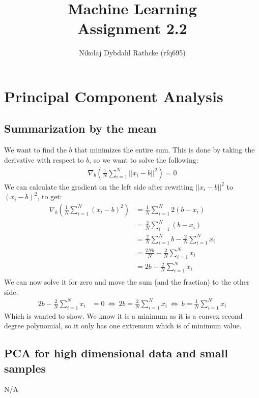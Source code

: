\documentclass[a4paper]{article}
\author{Nikolaj Dybdahl Rathcke (rfq695)}
\title{Machine Learning \\ Assignment 2.2}
\def\dpip{|\!|}
\begin{document}
\maketitle

\section{Principal Component Analysis}

\subsection{Summarization by the mean}
We want to find the $b$ that minimizes the entire sum. This is done by taking the derivative with respect to $b$, so we want to solve the following:
\begin{align*}
\nabla_b \left(\frac{1}{N}\sum_{i=1}^N \dpip x_i-b \dpip^2\right)=0
\end{align*}
We can calculate the gradient on the left side after rewriting $\dpip x_i-b\dpip^2$ to $(x_i-b)^2$, to get:
\begin{align*}
\nabla_b \left(\frac{1}{N}\sum_{i=1}^N (x_i-b)^2\right)&=\frac{1}{N}\sum_{i=1}^N 2(b-x_i) \\
&=\frac{2}{N}\sum_{i=1}^N (b-x_i) \\
&=\frac{2}{N}\sum_{i=1}^N b-\frac{2}{N}\sum_{i=1}^N x_i \\
&=\frac{2Nb}{N}-\frac{2}{N}\sum_{i=1}^N x_i \\
&=2b-\frac{2}{N}\sum_{i=1}^N x_i \\
\end{align*}
We can now solve it for zero and move the sum (and the fraction) to the other side:
\begin{align*}
2b-\frac{2}{N}\sum_{i=1}^N x_i &=0\ \Leftrightarrow\ 2b=\frac{2}{N}\sum_{i=1}^N x_i \ \Leftrightarrow\ b=\frac{1}{N}\sum_{i=1}^N x_i
\end{align*}
Which is wanted to show. We know it is a minimum as it is a convex second degree polynomial, so it only has one extremum which is of minimum value.

\subsection{PCA for high dimensional data and small samples}
N/A
\end{document}
